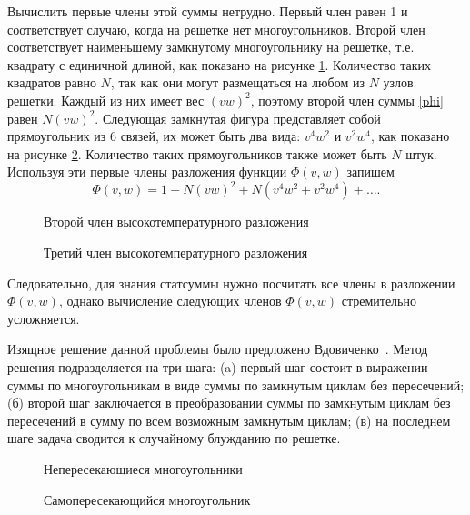Вычислить первые члены этой суммы нетрудно. Первый член равен 1 и
соответствует случаю, когда на решетке нет многоугольников. Второй член
соответствует наименьшему замкнутому многоугольнику на решетке, т.е. квадрату с единичной длиной, как показано на рисунке \ref{secondTermExtension}. Количество таких квадратов равно $N$, так как они могут размещаться на любом из $N$ узлов решетки. Каждый из них имеет вес $(vw)^2$, поэтому второй член суммы \eqref{phi} равен $N(vw)^2$. Следующая замкнутая фигура представляет собой прямоугольник из 6 связей, их может быть два вида: $v^4 w^2$ и $v^2 w^4$, как показано на рисунке \ref{thirdTermExtension}. Количество таких прямоугольников также может быть $N$ штук. Используя эти первые члены разложения функции $\Phi(v, w)$ запишем
\begin{equation}
\Phi(v, w) = 1 + N (vw)^2 + N (v^4 w^2 + v^2 w^4) + \dots.
\end{equation}

 \begin{figure}[h]
 	\caption{Второй член высокотемпературного разложения}
 	\label{secondTermExtension}
 \end{figure} 

 \begin{figure}[h]
 	\caption{Третий член высокотемпературного разложения}
 	\label{thirdTermExtension}
 \end{figure} 

Следовательно, для знания статсуммы нужно посчитать все члены в разложении $\Phi(v, w)$, однако вычисление следующих членов $\Phi(v, w)$ стремительно усложняется. 

Изящное решение данной проблемы было предложено Вдовиченко~\cite{vdovichenko1965_1}. Метод решения подразделяется на три шага: (a) первый шаг состоит в выражении суммы по многоугольникам в виде суммы по замкнутым циклам без пересечений; (б) второй шаг заключается в преобразовании суммы по замкнутым циклам без пересечений в сумму по всем возможным замкнутым циклам; (в) на последнем шаге задача сводится к случайному блужданию по решетке.

 \begin{figure}[h]
 	\caption{Непересекающиеся многоугольники}
 	\label{noInterpolygons}
 \end{figure}   

 \begin{figure}[h]
 	\caption{Самопересекающийся многоугольник}
 	\label{selfpolygons}
 \end{figure}  

